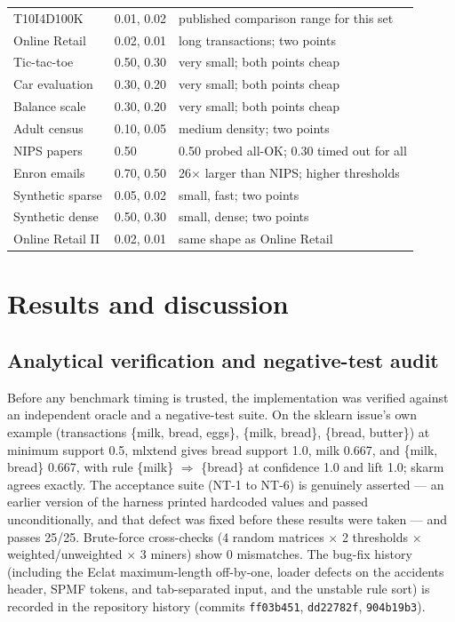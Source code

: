 \documentclass[twocolumn,10pt]{article}
\newcommand{\skarm}{\textsf{skarm}\xspace}
\begin{document}
\begin{table}[t]
\begin{tabular}{p{2.4cm}p{7.3cm}p{5.5cm}}
T10I4D100K & 0.01, 0.02 & published comparison range for this set \\
Online Retail & 0.02, 0.01 & long transactions; two points \\
Tic-tac-toe & 0.50, 0.30 & very small; both points cheap \\
Car evaluation & 0.30, 0.20 & very small; both points cheap \\
Balance scale & 0.30, 0.20 & very small; both points cheap \\
Adult census & 0.10, 0.05 & medium density; two points \\
NIPS papers & 0.50 & 0.50 probed all-OK; 0.30 timed out for all \\
Enron emails & 0.70, 0.50 & 26$\times$ larger than NIPS; higher thresholds \\
Synthetic sparse & 0.05, 0.02 & small, fast; two points \\
Synthetic dense & 0.50, 0.30 & small, dense; two points \\
Online Retail II & 0.02, 0.01 & same shape as Online Retail \\
\bottomrule
\end{tabular}
\end{table}

\section{Results and discussion}

\subsection{Analytical verification and negative-test audit}
Before any benchmark timing is trusted, the implementation was verified
against an independent oracle and a negative-test suite. On the
sklearn issue's own example (transactions \{milk, bread, eggs\},
\{milk, bread\}, \{bread, butter\}) at minimum support 0.5, mlxtend
gives bread support 1.0, milk 0.667, and \{milk, bread\} 0.667, with
rule \{milk\} $\Rightarrow$ \{bread\} at confidence 1.0 and lift 1.0;
\skarm agrees exactly. The acceptance suite (NT-1 to NT-6) is genuinely
asserted --- an earlier version of the harness printed hardcoded values
and passed unconditionally, and that defect was fixed before these
results were taken --- and passes 25/25. Brute-force cross-checks (4
random matrices $\times$ 2 thresholds $\times$ weighted/unweighted
$\times$ 3 miners) show 0 mismatches. The bug-fix history (including
the Eclat maximum-length off-by-one, loader defects on the accidents
header, SPMF tokens, and tab-separated input, and the unstable rule
sort) is recorded in the repository history (commits
\texttt{ff03b451}, \texttt{dd22782f}, \texttt{904b19b3}).
\end{document}
